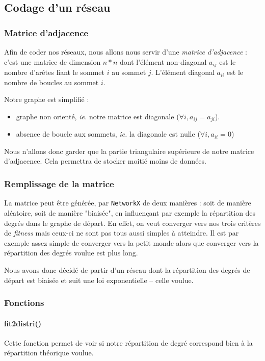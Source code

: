 \subsection{Codage d'un réseau}
\subsubsection{Matrice d'adjacence}
Afin de coder nos réseaux, nous allons nous servir d'une \textit{matrice d'adjacence} : c'est une matrice de dimension $n * n$ dont l'élément non-diagonal $a_{ij}$ est le nombre d'arêtes liant le sommet $i$ au sommet $j$. L'élément diagonal $a_{ii}$ est le nombre de boucles au sommet $i$.

Notre graphe est simplifié :
\begin{itemize}
 \item graphe non orienté, \textit{ie.} notre matrice est diagonale ($\forall i, a_{ij}=a_{ji}$).
 \item absence de boucle aux sommets, \textit{ie.} la diagonale est nulle ($\forall i, a_{ii}=0$)
\end{itemize}

Nous n'allons donc garder que la partie triangulaire supérieure de notre matrice d'adjacence. Cela permettra de stocker moitié moins de données.

\subsubsection{Remplissage de la matrice}
La matrice peut être générée, par \verb?NetworkX? de deux manières : soit de manière aléatoire, soit de manière "biaisée", en influençant par exemple la répartition des degrés dans le graphe de départ. En effet, on veut converger vers nos trois critères de \textit{fitness} mais ceux-ci ne sont pas tous aussi simples à atteindre. Il est par exemple assez simple de converger vers la petit monde alors que converger vers la répartition des degrés voulue est plus long.

Nous avons donc décidé de partir d'un réseau dont la répartition des degrés de départ est biaisée et suit une loi exponentielle -- celle voulue.


\subsubsection{Fonctions}

\paragraph*{fit2distri()} Cette fonction permet de voir si notre répartition de degré correspond bien à  la répartition théorique voulue.

